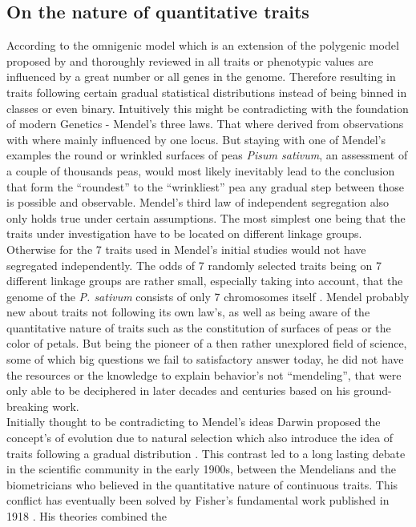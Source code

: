 \subsection{On the nature of quantitative traits}
According to the omnigenic model which is an extension of the polygenic model proposed by \cite{boyle2017expanded} and
thoroughly reviewed in \cite{timpson2018} all traits or phenotypic values are influenced
by a great number or all genes in the genome. Therefore resulting in traits following certain gradual statistical distributions
instead of being binned in classes or even binary. Intuitively this might be contradicting with the foundation of modern Genetics -
Mendel's three laws. That where derived from observations with where mainly influenced by one locus. But staying with one of
Mendel's examples the round or wrinkled surfaces of  peas \textit{Pisum sativum}, an assessment of a couple of thousands peas, would
most likely inevitably
lead to the conclusion that form the ``roundest'' to the ``wrinkliest'' pea any gradual step between those is possible and observable.
Mendel's third law of independent segregation also only holds true under certain assumptions. The most simplest one being that the traits
under investigation have to be located on different linkage groups. Otherwise for the 7 traits used in Mendel's initial studies would not have
segregated independently. The odds of 7 randomly selected traits being on 7 different linkage groups are rather small, especially taking
into account, that the genome of the \textit{P. sativum} consists of only 7 chromosomes itself \cite{kalo2004}. Mendel probably new about
traits not following its own law's,
as well as being aware of the quantitative nature of traits such as the constitution of surfaces of peas or the color of petals. But being the
pioneer of a then rather unexplored field of science, some of which big questions we fail to satisfactory answer today, he did not have the
resources or the knowledge to explain behavior's not ``mendeling'', that were only able to be deciphered in later decades and centuries
based on his ground-breaking work.  \\
Initially thought to be contradicting to Mendel's ideas Darwin proposed the concept's of evolution due to natural selection which also
introduce the idea of traits following a gradual distribution \cite{darwin1859}. This contrast led to a long lasting debate in the
scientific community in the early 1900s, between the Mendelians and the biometricians who believed in the quantitative nature of continuous
traits. This conflict has eventually been solved by Fisher's fundamental work published in 1918 \cite{fisher1919xv}. His theories combined the
